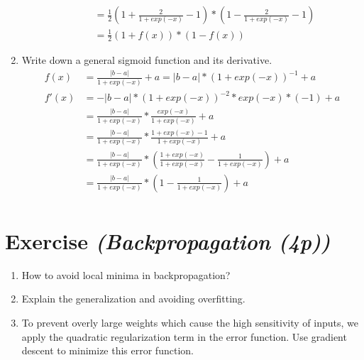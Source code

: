 \documentclass{article}
\begin{document}
\begin{enumerate}
\begin{enumerate}
\begin{align*}
              &= \frac{1}{2}(1+\frac{2}{1+exp(-x)} -1)*(1-\frac{2}{1+exp(-x)} -1)\\
              &= \frac{1}{2}(1+f(x))*(1-f(x))
    \end{align*}
        \end{enumerate}
    \item Write down a general sigmoid function and its derivative.
        \begin{align*}
            f(x) &= \frac{|b-a|}{1+exp(-x)}+a  =
            |b-a|*(1+exp(-x))^{-1}+a\\
            f'(x) &= -|b-a|*(1+exp(- x))^{-2}*exp(-x)*(-1)+a\\
                  &= \frac{|b-a|}{1+exp(- x)}*\frac{exp(-x)}{1+exp(- x)}+a\\
                  &= \frac{|b-a|}{1+exp(- x)}*\frac{1+exp(-x)-1}{1+exp(- x)}+a\\
                  &= \frac{|b-a|}{1+exp(- x)}*(\frac{1+exp(-x)}{1+exp(-
        x)}-\frac{1}{1+exp(-x)})+a\\
                  &= \frac{|b-a|}{1+exp(- x)}*(1-\frac{1}{1+exp(-x)})+a\\
        \end{align*}
\end{enumerate}

\section{Exercise \textit{(Backpropagation (4p))}}
\begin{enumerate}
    \item How to avoid local minima in backpropagation?
    \item Explain the generalization and avoiding overfitting.
    \item To prevent overly large weights which cause the high sensitivity of inputs, we apply the
        quadratic regularization term in the error function. Use gradient descent to minimize this
        error function.
\end{enumerate}
\end{document}
